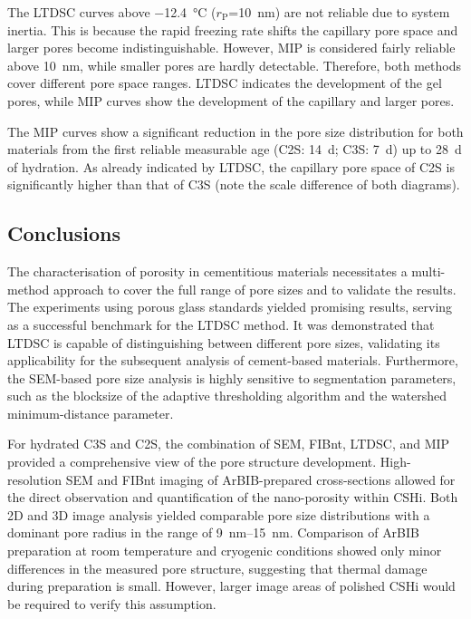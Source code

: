 The \ac{LTDSC} curves above \qty{-12.4}{\celsius} ($r_\text{P}$=\qty{10}{\nano\meter}) are not reliable due to system inertia.
This is because the rapid freezing rate shifts the capillary pore space and larger pores become indistinguishable.
However, \ac{MIP} is considered fairly reliable above \qty{10}{\nano\meter}, while smaller pores are hardly detectable.
Therefore, both methods cover different pore space ranges.
\ac{LTDSC} indicates the development of the gel pores, while \ac{MIP} curves show the development of the capillary and larger pores.

The \ac{MIP} curves show a significant reduction in the pore size distribution for both materials from the first reliable measurable age (\ac{C2S}: \qty{14}{\day}; \ac{C3S}: \qty{7}{\day}) up to \qty{28}{\day} of hydration.
As already indicated by \ac{LTDSC}, the capillary pore space of \ac{C2S} is significantly higher than that of \ac{C3S} (note the scale difference of both diagrams).

\FloatBarrier
\subsection{Conclusions}

The characterisation of porosity in cementitious materials necessitates a multi-method approach to cover the full range of pore sizes and to validate the results.
The experiments using porous glass standards yielded promising results, serving as a successful benchmark for the \ac{LTDSC} method.
It was demonstrated that \ac{LTDSC} is capable of distinguishing between different pore sizes, validating its applicability for the subsequent analysis of cement-based materials.
Furthermore, the \ac{SEM}-based pore size analysis is highly sensitive to segmentation parameters, such as the blocksize of the adaptive thresholding algorithm and the watershed minimum-distance parameter.

For hydrated \ac{C3S} and \ac{C2S}, the combination of \ac{SEM}, \ac{FIBnt}, \ac{LTDSC}, and \ac{MIP} provided a comprehensive view of the pore structure development.
High-resolution \ac{SEM} and \ac{FIBnt} imaging of \ac{ArBIB}-prepared cross-sections allowed for the direct observation and quantification of the nano-porosity within \ac{CSHi}.
Both 2D and 3D image analysis yielded comparable pore size distributions with a dominant pore radius in the range of \qtyrange{9}{15}{\nano\meter}.
Comparison of \ac{ArBIB} preparation at room temperature and cryogenic conditions showed only minor differences in the measured pore structure, suggesting that thermal damage during preparation is small.
However, larger image areas of polished \ac*{CSHi} would be required to verify this assumption.

